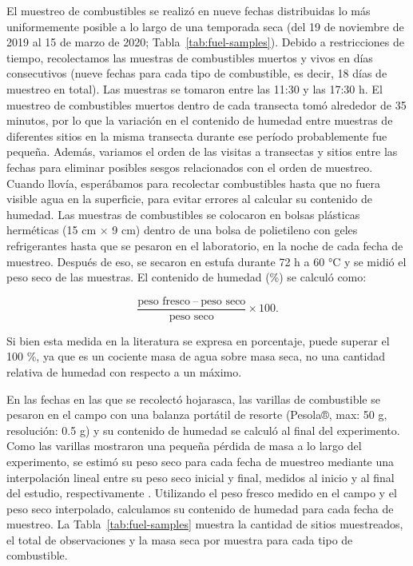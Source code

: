 El muestreo de combustibles se realizó en nueve fechas distribuidas lo más uniformemente posible a lo largo de una temporada seca (del 19 de noviembre de 2019 al 15 de marzo de 2020; Tabla~\ref{tab:fuel-samples}). Debido a restricciones de tiempo, recolectamos las muestras de combustibles muertos y vivos en días consecutivos (nueve fechas para cada tipo de combustible, es decir, 18 días de muestreo en total). Las muestras se tomaron entre las 11:30 y las 17:30 h. El muestreo de combustibles muertos dentro de cada transecta tomó alrededor de 35 minutos, por lo que la variación en el contenido de humedad entre muestras de diferentes sitios en la misma transecta durante ese período probablemente fue pequeña. Además, variamos el orden de las visitas a transectas y sitios entre las fechas para eliminar posibles sesgos relacionados con el orden de muestreo. Cuando llovía, esperábamos para recolectar combustibles hasta que no fuera visible agua en la superficie, para evitar errores al calcular su contenido de humedad. Las muestras de combustibles se colocaron en bolsas plásticas herméticas (15 cm $\times$ 9 cm) dentro de una bolsa de polietileno con geles refrigerantes hasta que se pesaron en el laboratorio, en la noche de cada fecha de muestreo. Después de eso, se secaron en estufa durante 72 h a 60 °C y se midió el peso seco de las muestras. El contenido de humedad (\%) se calculó como:

\[
\frac{\text{peso fresco} \ – \ \text{peso seco}}{\text{peso seco}} \times 100.
\]

Si bien esta medida en la literatura se expresa en porcentaje, puede superar el 100 \%, ya que es un cociente masa de agua sobre masa seca, no una cantidad relativa de humedad con respecto a un máximo. 

En las fechas en las que se recolectó hojarasca, las varillas de combustible se pesaron en el campo con una balanza portátil de resorte (Pesola®, max: 50 g, resolución: 0.5 g) y su contenido de humedad se calculó al final del experimento. Como las varillas mostraron una pequeña pérdida de masa a lo largo del experimento, se estimó su peso seco para cada fecha de muestreo mediante una interpolación lineal entre su peso seco inicial y final, medidos al inicio y al final del estudio, respectivamente \citep{haines_weathering_1978}. Utilizando el peso fresco medido en el campo y el peso seco interpolado, calculamos su contenido de humedad para cada fecha de muestreo. La Tabla~\ref{tab:fuel-samples} muestra la cantidad de sitios muestreados, el total de observaciones y la masa seca por muestra para cada tipo de combustible.

